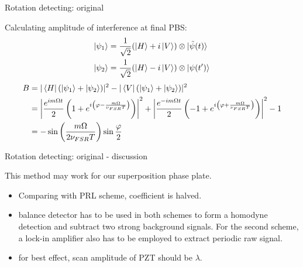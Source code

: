 \documentclass[amssymb, amsmath]{beamer}
\begin{document}
\begin{frame}{Rotation detecting: original}

Calculating amplitude of interference at final PBS:
\begin{subequations}
\begin{align}
    \ket{\psi_1} &= \frac{1}{\sqrt{2}}(\ket H + i\ket V)\otimes\ket{\tilde{\psi}(t)} \\
    \ket{\psi_2} &= \frac{1}{\sqrt{2}}(\ket H - i\ket V)\otimes\ket{\psi(t^\prime)}
\end{align}
\end{subequations}    
\begin{align}
    B &= |\bra{H}(\ket{\psi_1}+\ket{\psi_2})|^2 - |\bra{V}(\ket{\psi_1}+\ket{\psi_2})|^2 \nonumber\\
    &= \left|\frac{e^{i m \Omega t}}{2}\left(1+e^{i\left(\varphi-\frac{m \Omega}{\nu_{FSR}T}\right)}\right)\right|^2 + \left|\frac{e^{-i m \Omega t}}{2}\left(-1+e^{i\left(\varphi+\frac{m \Omega}{\nu_{FSR}T}\right)}\right)\right|^2 -1 \nonumber\\
    &= -\sin\left(\frac{m \Omega}{2 \nu_{FSR}T}\right)\sin \frac{\varphi}{2}
\end{align}
\end{frame}

\begin{frame}{Rotation detecting: original - discussion}

This method may work for our superposition phase plate.
\begin{itemize}
    \item Comparing with PRL scheme, coefficient is halved.
    \item balance detector has to be used in both schemes to form a homodyne detection and subtract two strong background signals. For the second scheme, a lock-in amplifier also has to be employed to extract periodic raw signal. 
    \item for best effect, scan amplitude of PZT should be $\lambda$.
\end{itemize}

    
\end{frame}
\end{document}
